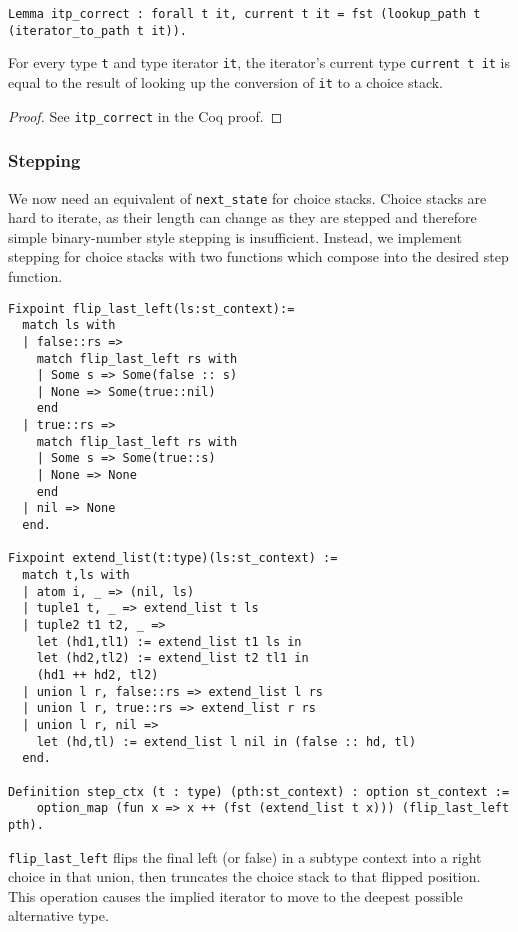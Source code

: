 \documentclass[a4paper,UKenglish]{lipics-v2018}
\begin{document}
\begin{lemma}
\begin{verbatim}
Lemma itp_correct : forall t it, current t it = fst (lookup_path t (iterator_to_path t it)).
\end{verbatim}

For every type \verb|t| and type iterator \verb|it|, the iterator's current type \verb|current t it| is equal
to the result of looking up the conversion of \verb|it| to a choice stack.
\end{lemma}
\begin{proof}
See \verb|itp_correct| in the Coq proof.
\end{proof}

\subsubsection{Stepping}

We now need an equivalent of \verb|next_state| for choice stacks. Choice stacks
are hard to iterate, as their length can change as they are stepped and therefore
simple binary-number style stepping is insufficient. Instead, we implement stepping
for choice stacks with two functions which compose into the desired step function.

\begin{verbatim}
Fixpoint flip_last_left(ls:st_context):=
  match ls with
  | false::rs =>
    match flip_last_left rs with
    | Some s => Some(false :: s)
    | None => Some(true::nil)
    end
  | true::rs =>
    match flip_last_left rs with
    | Some s => Some(true::s)
    | None => None
    end
  | nil => None
  end.

Fixpoint extend_list(t:type)(ls:st_context) :=
  match t,ls with
  | atom i, _ => (nil, ls)
  | tuple1 t, _ => extend_list t ls
  | tuple2 t1 t2, _ =>
    let (hd1,tl1) := extend_list t1 ls in
    let (hd2,tl2) := extend_list t2 tl1 in
    (hd1 ++ hd2, tl2)
  | union l r, false::rs => extend_list l rs
  | union l r, true::rs => extend_list r rs
  | union l r, nil =>
    let (hd,tl) := extend_list l nil in (false :: hd, tl)
  end.

Definition step_ctx (t : type) (pth:st_context) : option st_context := 
	option_map (fun x => x ++ (fst (extend_list t x))) (flip_last_left pth).
\end{verbatim}

\verb|flip_last_left| flips the final left (or false) in a subtype
context into a right choice in that union, then truncates the choice 
stack to that flipped position. This operation causes the implied iterator
to move to the deepest possible alternative type.
\end{document}
